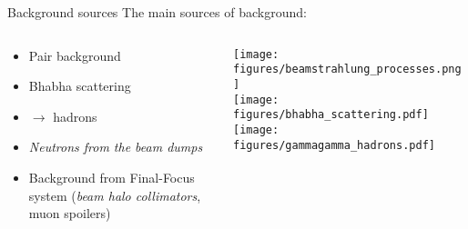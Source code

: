 \begin{frame}{Background sources}
\ilclogo
The main sources of background:
\begin{columns}
 \begin{column}{0.55\textwidth}
  \begin{itemize}
    \item Pair background
    \item Bhabha scattering
    \item \textgamma \textgamma $\rightarrow$ hadrons
    \item \emph{Neutrons from the beam dumps}
    \item Background from Final-Focus system (\emph{beam halo collimators}, muon spoilers)
  \end{itemize}
 \end{column}
 \begin{column}{0.45\textwidth}
 \texttt{[image: figures/beamstrahlung\_processes.png]}\\
 \texttt{[image: figures/bhabha\_scattering.pdf]} 
 \texttt{[image: figures/gammagamma\_hadrons.pdf]}
 \end{column}
\end{columns}

\end{frame}


